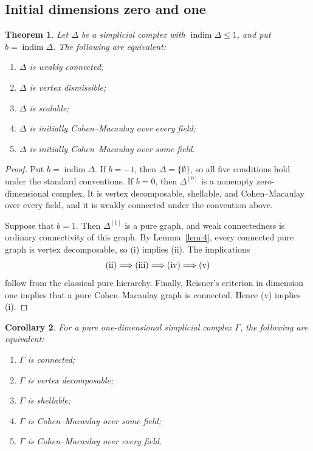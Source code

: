 \documentclass[11pt]{amsart}
\DeclareMathOperator{\indim}{indim}
\newtheorem{theorem}{Theorem}[section]
\newtheorem{corollary}[theorem]{Corollary}
\theoremstyle{definition}
\begin{document}
	\subsection{Initial dimensions zero and one}
	\label{subsec:1}
	
	\begin{theorem}\label{thm:4}
		Let $\Delta$ be a simplicial complex with $\indim\Delta\leq1$, and put $b=\indim\Delta$.  The following are equivalent:
		\begin{enumerate}[label=\textup{(\roman*)}]
			\item $\Delta$ is weakly connected;
			\item $\Delta$ is vertex dismissible;
			\item $\Delta$ is scalable;
			\item $\Delta$ is initially Cohen--Macaulay over every field;
			\item $\Delta$ is initially Cohen--Macaulay over some field.
		\end{enumerate}
	\end{theorem}
	
	\begin{proof}
		Put $b=\indim\Delta$.  If $b=-1$, then $\Delta=\{\emptyset\}$, so all five conditions hold under the standard conventions.  If $b=0$, then $\Delta^{[0]}$ is a nonempty zero-dimensional complex.  It is vertex decomposable, shellable, and Cohen--Macaulay over every field, and it is weakly connected under the convention above.
		
		Suppose that $b=1$.  Then $\Delta^{[1]}$ is a pure graph, and weak connectedness is ordinary connectivity of this graph.  By Lemma~\ref{lem:4}, every connected pure graph is vertex decomposable, so (i) implies (ii).  The implications
		\[
		\textup{(ii)}\Longrightarrow\textup{(iii)}
		\Longrightarrow\textup{(iv)}\Longrightarrow\textup{(v)}
		\]
		follow from the classical pure hierarchy.  Finally, Reisner's criterion in dimension one implies that a pure Cohen--Macaulay graph is connected.  Hence (v) implies (i).
	\end{proof}
	
	\begin{corollary}\label{cor:3}
		For a pure one-dimensional simplicial complex $\Gamma$, the following are equivalent:
		\begin{enumerate}[label=\textup{(\roman*)}]
			\item $\Gamma$ is connected;
			\item $\Gamma$ is vertex decomposable;
			\item $\Gamma$ is shellable;
			\item $\Gamma$ is Cohen--Macaulay over some field;
			\item $\Gamma$ is Cohen--Macaulay over every field.
		\end{enumerate}
	\end{corollary}
	
\end{document}
